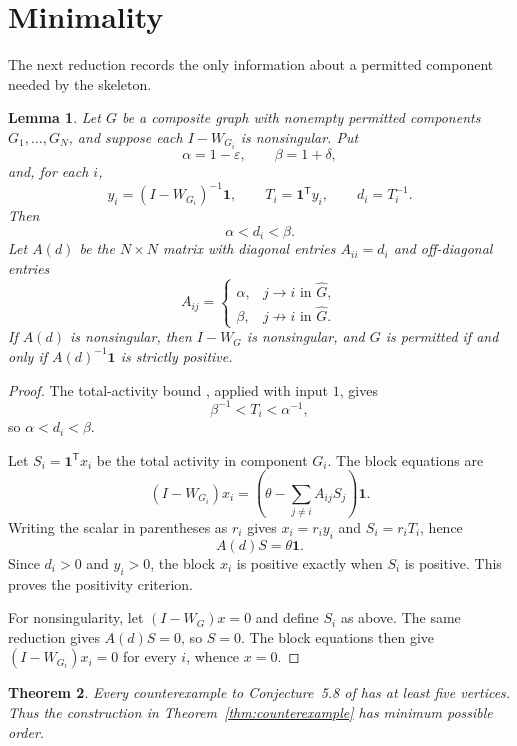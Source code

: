 \documentclass[11pt]{amsart}
\newtheorem{theorem}{Theorem}
\newtheorem{lemma}[theorem]{Lemma}
\newcommand{\one}{\mathbf{1}}
\newcommand{\eps}{\varepsilon}
\begin{document}
\section{Minimality}

The next reduction records the only information about a permitted
component needed by the skeleton.

\begin{lemma}\label{lem:reduction}
Let $G$ be a composite graph with nonempty permitted components
$G_1,\dots,G_N$, and suppose each $I-W_{G_i}$ is nonsingular. Put
\[
\alpha=1-\eps,
\qquad
\beta=1+\delta,
\]
and, for each $i$,
\[
y_i=(I-W_{G_i})^{-1}\one,
\qquad
T_i=\one^{\mathsf T}y_i,
\qquad
d_i=T_i^{-1}.
\]
Then
\[
\alpha<d_i<\beta.
\]
Let $A(d)$ be the $N\times N$ matrix with diagonal entries $A_{ii}=d_i$
and off-diagonal entries
\[
A_{ij}=
\begin{cases}
\alpha, & j\to i\text{ in }\widehat G,\\
\beta, & j\not\to i\text{ in }\widehat G.
\end{cases}
\]
If $A(d)$ is nonsingular, then $I-W_G$ is nonsingular, and $G$ is
permitted if and only if $A(d)^{-1}\one$ is strictly positive.
\end{lemma}

\begin{proof}
The total-activity bound \cite[Lemma~3.1]{CGM}, applied with input $1$,
gives
\[
\beta^{-1}<T_i<\alpha^{-1},
\]
so $\alpha<d_i<\beta$.

Let $S_i=\one^{\mathsf T}x_i$ be the total activity in component $G_i$.
The block equations are
\[
(I-W_{G_i})x_i
=
\left(\theta-\sum_{j\ne i}A_{ij}S_j\right)\one.
\]
Writing the scalar in parentheses as $r_i$ gives $x_i=r_i y_i$ and
$S_i=r_iT_i$, hence
\[
A(d)S=\theta\one.
\]
Since $d_i>0$ and $y_i>0$, the block $x_i$ is positive exactly when
$S_i$ is positive. This proves the positivity criterion.

For nonsingularity, let $(I-W_G)x=0$ and define $S_i$ as above. The same
reduction gives $A(d)S=0$, so $S=0$. The block equations then give
$(I-W_{G_i})x_i=0$ for every $i$, whence $x=0$.
\end{proof}

\begin{theorem}\label{thm:minimal}
Every counterexample to Conjecture~5.8 of \cite{CGM} has at least five
vertices. Thus the construction in Theorem~\ref{thm:counterexample} has
minimum possible order.
\end{theorem}
\end{document}
